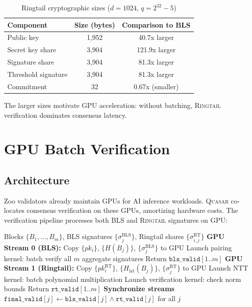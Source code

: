 \documentclass[11pt,letterpaper]{article}
\theoremstyle{definition}
\theoremstyle{remark}
\newcommand{\Quasar}{\textsc{Quasar}}
\newcommand{\Ringtail}{\textsc{Ringtail}}
\begin{document}
\begin{table}[h]
\centering
\begin{tabular}{lcc}
\toprule
\textbf{Component} & \textbf{Size (bytes)} & \textbf{Comparison to BLS} \\
\midrule
Public key & 1,952 & 40.7x larger \\
Secret key share & 3,904 & 121.9x larger \\
Signature share & 3,904 & 81.3x larger \\
Threshold signature & 3,904 & 81.3x larger \\
Commitment & 32 & 0.67x (smaller) \\
\bottomrule
\end{tabular}
\caption{Ringtail cryptographic sizes ($d = 1024$, $q = 2^{32} - 5$)}
\label{tab:ringtail-sizes}
\end{table}

The larger sizes motivate GPU acceleration: without batching, \Ringtail{} verification dominates consensus latency.

\section{GPU Batch Verification}

\subsection{Architecture}

Zoo validators already maintain GPUs for AI inference workloads. \Quasar{} co-locates consensus verification on these GPUs, amortizing hardware costs. The verification pipeline processes both BLS and \Ringtail{} signatures on GPU:

\begin{algorithm}
\caption{GPU Dual-Path Batch Verification}
\begin{algorithmic}[1]
\REQUIRE Blocks $\{B_1, \ldots, B_m\}$, BLS signatures $\{\sigma^{\text{BLS}}_j\}$, Ringtail shares $\{\sigma^{\text{RT}}_{i,j}\}$
\STATE \textbf{GPU Stream 0 (BLS):}
\STATE \quad Copy $\{pk_i\}$, $\{H(B_j)\}$, $\{\sigma^{\text{BLS}}_j\}$ to GPU
\STATE \quad Launch pairing kernel: batch verify all $m$ aggregate signatures
\STATE \quad Return $\texttt{bls\_valid}[1..m]$
\STATE \textbf{GPU Stream 1 (Ringtail):}
\STATE \quad Copy $\{pk^{\text{RT}}_i\}$, $\{H_{\text{lat}}(B_j)\}$, $\{\sigma^{\text{RT}}_j\}$ to GPU
\STATE \quad Launch NTT kernel: batch polynomial multiplication
\STATE \quad Launch verification kernel: check norm bounds
\STATE \quad Return $\texttt{rt\_valid}[1..m]$
\STATE \textbf{Synchronize streams}
\STATE $\texttt{final\_valid}[j] \leftarrow \texttt{bls\_valid}[j] \wedge \texttt{rt\_valid}[j]$ for all $j$
\end{algorithmic}
\end{algorithm}
\end{document}
